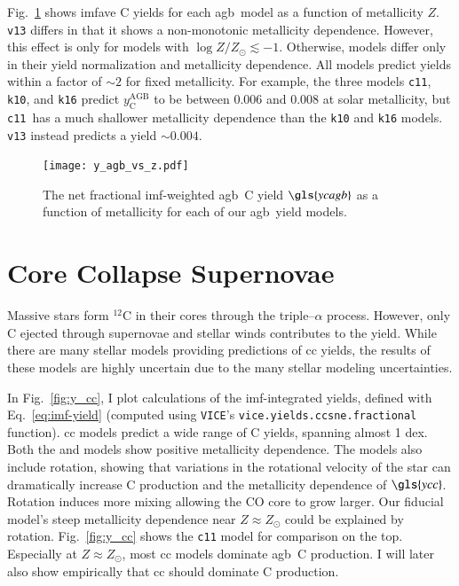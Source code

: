 \documentclass[12pt,oneside,letterpaper]{report}
\newcommand{\cc}{\gls{cc}}
\newcommand{\agb}{\gls{agb}}
\newcommand{\imf}{\gls{imf}}
\newcommand{\cxi}{\texttt{\gls{c11}}}
\newcommand{\kx}{\texttt{\gls{k10}}}
\newcommand{\kxvi}{\texttt{\gls{k16}}}
\newcommand{\vxiii}{\texttt{\gls{v13}}}
\newcommand{\Ycc}{\gls{ycc}}
\newcommand{\Ycagb}{\gls{ycagb}}
\newcommand{\VICE}{\texttt{VICE}}
\newcommand{\about}[1]{${\sim} #1$}
\begin{document}
Fig.~\ref{fig:yagb-z} shows \gls{imfave} C yields for each \agb\ model as a function of metallicity $Z$.
\vxiii{} differs in that it shows a non-monotonic metallicity dependence. However, this effect is only for models with $\log Z/Z_\odot \lesssim -1$.
Otherwise, models differ only in their yield normalization and metallicity dependence. All models predict yields within a factor of \about{2} for fixed metallicity.
For example, the three models \cxi, \kx{}, and \kxvi{} predict $y_\text{C}^\text{AGB}$ to be between 0.006 and 0.008 at solar metallicity, but \cxi\ has a much shallower metallicity dependence than the \kx{} and \kxvi{} models. \vxiii{} instead predicts a yield \about{0.004}.

\begin{figure}[htp]
    \centering
    \texttt{[image: y\_agb\_vs\_z.pdf]}

    \caption[Low mass yield metallicity dependence]{The net fractional \imf-weighted \agb\ C yield $\Ycagb$ as a function of metallicity for each of our \agb\ yield models.
    }
    \label{fig:yagb-z}
\end{figure}

\section{Core Collapse Supernovae}


Massive stars form $^{12}$C in their cores through the triple--$\alpha$ process. However, only C ejected through supernovae and stellar winds contributes to the yield. 
While there are many stellar models providing predictions of \cc{} yields, the results of these models are highly uncertain due to the many stellar modeling uncertainties. 

In Fig.~\ref{fig:y_cc}, I plot calculations of the \imf-integrated yields, defined with Eq.~\ref{eq:imf-yield} (computed using \VICE's \texttt{vice.yields.ccsne.fractional} function). 
\cc{} models predict a wide range of C yields, spanning almost 1 dex. 
Both the \citet{NKT13} and \cite{LC18} models show positive metallicity dependence. 
The \cite{LC18} models also include rotation, showing that variations in the rotational velocity of the star can dramatically increase C production and the metallicity dependence of $\Ycc$. Rotation induces more mixing allowing the CO core to grow larger. Our fiducial model's steep metallicity dependence near $Z\approx Z_\odot$ could be explained by rotation. 
Fig.~\ref{fig:y_cc} shows the \cxi{} model for comparison on the top. Especially at $Z\approx Z_\odot$, most \cc{} models dominate \agb\ C production. I will later also show empirically that \cc{} should dominate C production. 
\end{document}
